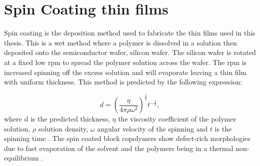 \documentclass[MasterThesisMain.tex]{subfiles}
\begin{document}
\section{Spin Coating thin films}
Spin coating is the deposition method used to fabricate the thin films used in this thesis. This is a wet method where a polymer is dissolved in a solution then deposited onto the semiconductor wafer, silicon wafer. The silicon wafer is rotated at a fixed low rpm to spread the polymer solution across the wafer. The rpm is increased spinning off the excess solution and will evaporate leaving a thin film with uniform thickness. This method is predicted by the following expression:

\begin{equation}\label{eq:spin}
d = \left(\frac{\eta}{4\pi\rho\omega^2}\right)^{\frac{1}{2}} t^{-\frac{1}{2}},
\end{equation}  
where d is the predicted thickness, $\eta$ the viscosity coefficient of the polymer solution, $\rho$ solution density, $\omega$ angular velocity of the spinning and $t$ is the spinning time \cite{petty2008molecular}. The spin coated block copolymers show defect-rich morphologies due to fast evaporation of the solvent and the polymers being in a thermal non-equilibrium \cite{PosseltBCP}.
\end{document}
